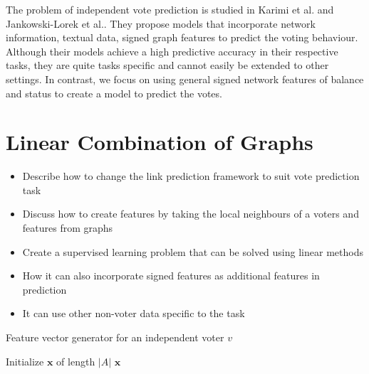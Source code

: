 The problem of independent vote prediction is studied in Karimi et al. \cite{karimi2019multicongress} and Jankowski-Lorek et al.\cite{jankowski-lorek2013MBSN}. They propose models that incorporate network information, textual data, signed graph features to predict the voting behaviour. Although their models achieve a high predictive accuracy in their respective tasks, they are quite tasks specific and cannot easily be extended to other settings. In contrast, we focus on using general signed network features of balance and status to create a model to predict the votes. 

\fi

\section{Linear Combination of Graphs}
\label{sec:linear-combination-theory}
\begin{itemize}
    \item Describe how to change the link prediction framework to suit vote prediction task
    \item Discuss how to create features by taking the local neighbours of a voters and features from graphs 
    \item Create a supervised learning problem that can be solved using linear methods
    \item How it can also incorporate signed features as additional features in prediction
    \item It can use other non-voter data specific to the task
\end{itemize}


\begin{algorithm}[H]
    \DontPrintSemicolon
    \caption{Feature vector generator for an independent voter $v$ }
    Initialize $\mathbf{x}$ of length $|A|$
    \Return $\mathbf{x}$
   \end{algorithm}
   
